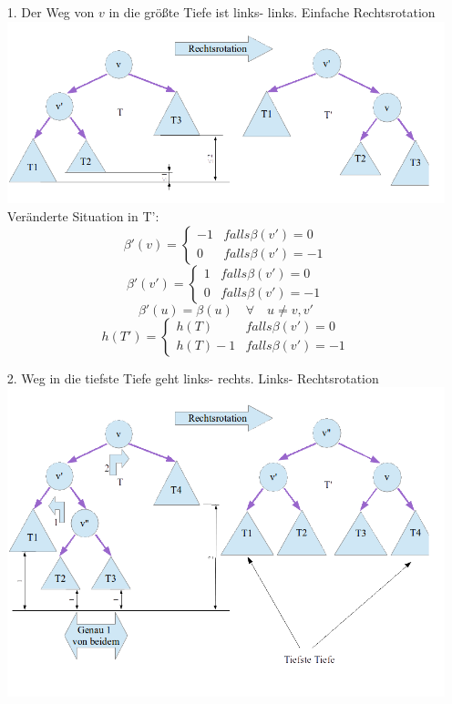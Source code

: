 \documentclass[fleqn]{scrartcl}
\begin{document}
\begin{itemize}
\item[1.] Der Weg von $v$ in die größte Tiefe ist links- links.
\subitem Einfache Rechtsrotation \\
\includegraphics[width = \textwidth]{./Rechtsrotation}
\subitem Veränderte Situation in T':
\[\beta ' (v) = \left\{ \begin{array} {ll}
-1 & falls \beta(v') = 0\\
0 & falls \beta(v') = -1
\end{array}\right.\]
\[\beta ' (v') = \left\{ \begin{array} {ll}
1 & falls \beta(v') = 0\\
0 & falls \beta(v') = -1
\end{array}\right.\]
\[\beta ' (u) = \beta(u) \quad \forall \quad u \neq v, v'\]
\[h(T') = \left\{ \begin{array} {ll}
h(T) & falls \beta(v') = 0\\
h(T) -1 & falls \beta(v') = -1
\end{array}\right.\]
\newpage
\item[2.] Weg in die tiefste Tiefe geht links- rechts.
\subitem Links- Rechtsrotation \\
\includegraphics[width = \textwidth]{LinksRechtsrotation.png}

\end{itemize}
\end{document}
